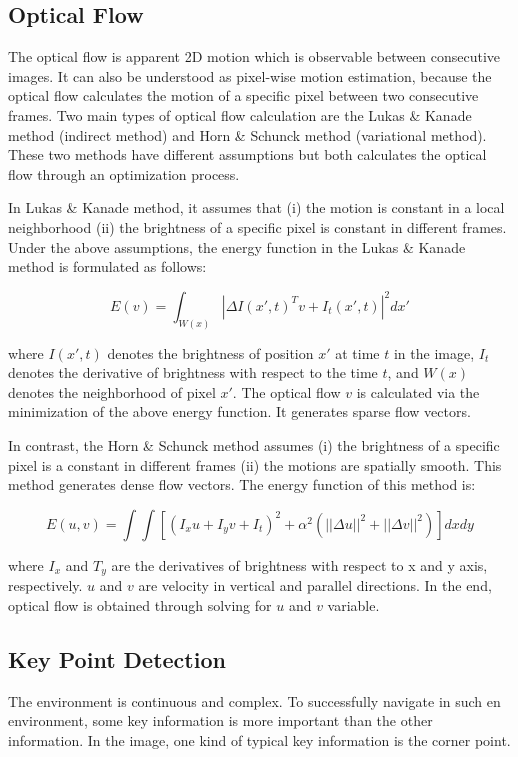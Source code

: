 \documentclass{easychair}
\begin{document}
\subsection{Optical Flow} The optical flow is apparent 2D motion which is observable between consecutive images. It can also be understood as pixel-wise motion estimation, because the optical flow calculates the motion of a specific pixel between two consecutive frames. Two main types of optical flow calculation are the Lukas \& Kanade method (indirect method) and Horn \& Schunck method (variational method). These two methods have different assumptions but both calculates the optical flow through an optimization process.

In Lukas \& Kanade method, it assumes that (i) the motion is constant in a local neighborhood (ii) the brightness of a specific pixel is constant in different frames. Under the above assumptions, the energy function in the Lukas \& Kanade method is formulated as follows:

\begin{equation}
E(v) = \int_{W(x)} |\Delta I(x', t)^Tv + I_t(x',t) |^2dx'
\end{equation}

where $I(x',t)$ denotes the brightness of position $x'$ at time $t$ in the image, $I_t$ denotes the derivative of brightness with respect to the time $t$, and $W(x)$ denotes the neighborhood of pixel $x'$. The optical flow $v$ is calculated via the minimization of the above energy function. It generates sparse flow vectors.

In contrast, the Horn \& Schunck method assumes (i) the brightness of a specific pixel is a constant in different frames (ii) the motions are spatially smooth. This method generates dense flow vectors. The energy function of this method is:

\begin{equation}
E(u,v) = \int\int[(I_xu + I_yv + I_t)^2+\alpha^2(||\Delta u ||^2 + ||\Delta v ||^2)]dxdy
\end{equation} 

where $I_x$ and $T_y$ are the derivatives of brightness with respect to x and y axis, respectively. $u$ and $v$ are velocity in vertical and parallel directions. In the end, optical flow is obtained through solving for $u$ and $v$ variable.		

\subsection{Key Point Detection}
The environment is continuous and complex. To successfully navigate in such en environment, some key information is more important than the other information. In the image, one kind of typical key information is the corner point. 
\end{document}
